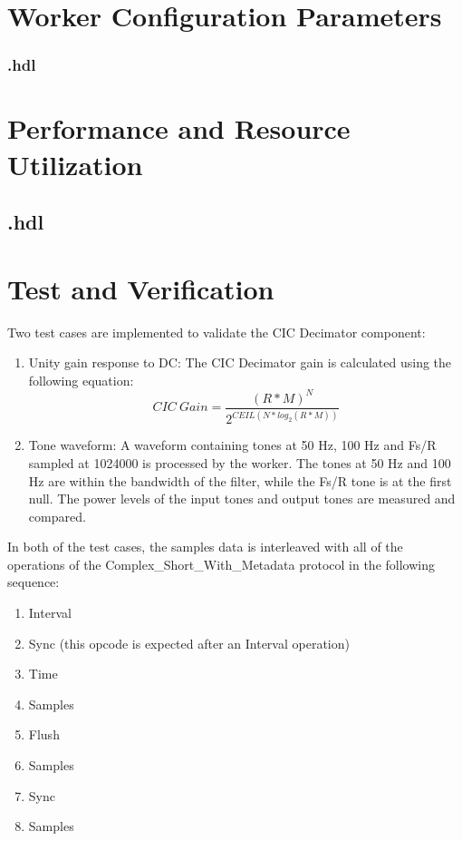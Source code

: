 \begin{landscape}
\section*{Worker Configuration Parameters}
\subsubsection*{\comp.hdl}

\section*{Performance and Resource Utilization}
\subsection*{\comp.hdl}

\end{landscape}
\newpage
\section*{Test and Verification}
Two test cases are implemented to validate the CIC Decimator component:

\begin{enumerate}
	\item Unity gain response to DC: The CIC Decimator gain is calculated using the following equation:
	      \begin{equation} \label{eq:cic_gain}
	      	CIC\ Gain = \frac{(R*M)^N}{2^{CEIL(N*log_2(R*M))}}
	      \end{equation}
	\item Tone waveform: A waveform containing tones at 50 Hz, 100 Hz and Fs/R sampled at 1024000 is processed by the worker. The tones at 50 Hz and 100 Hz are within the bandwidth of the filter, while the Fs/R tone is at the first null. The power levels of the input tones and output tones are measured and compared.
\end{enumerate}\medskip

In both of the test cases, the samples data is interleaved with all of the operations of the Complex\_Short\_With\_Metadata protocol in the following sequence:
\begin{enumerate}
	\item Interval
	\item Sync (this opcode is expected after an Interval operation)
	\item Time
	\item Samples
	\item Flush	
	\item Samples
	\item Sync
	\item Samples
\end{enumerate}




